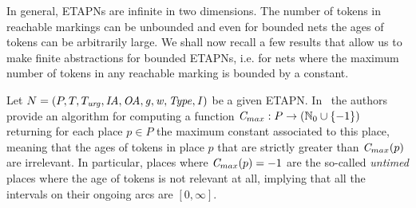 %
%
%



In general, ETAPNs are infinite in two dimensions. The number of tokens
in reachable markings can be unbounded and even for bounded nets
the ages of tokens can be arbitrarily large. We shall now recall a 
few results that allow us to make finite abstractions for bounded
ETAPNs, i.e. for nets where the maximum number of tokens in any
reachable marking is bounded by a constant.

Let $N=(P, T, T_{\mathit{urg}}, \mathit{IA},\allowbreak \mathit{OA}, \mathit{g}, \mathit{w}, \mathit{Type}, \mathit{I})$ be a given ETAPN.
In~\cite{ALSST:MEMICS:12} 
the authors provide an algorithm for computing 
a function $\mathit{C}_{max}: P \rightarrow (\mathbb{N}_{0} \cup \{ -1 \})$ 
returning for each place $p \in P$ the maximum constant associated
to this place, meaning that the ages of tokens in place $p$ that
are strictly greater than $\mathit{C}_{max}(p)$ are irrelevant. In particular,
places where $\mathit{C}_{max}(p)=-1$ are the so-called \emph{untimed} places
where the age of tokens is not relevant at all, implying that all
the intervals on their ongoing arcs are $[0,\infty]$.

